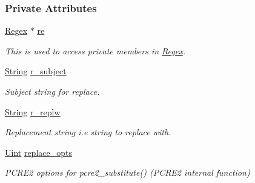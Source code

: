 \subsubsection*{Private Attributes}
\begin{DoxyCompactItemize}
\item 
\hypertarget{classjpcre2_1_1RegexReplace_ab8adfdb3aade18fe6bff03fb3262c396}{}\label{classjpcre2_1_1RegexReplace_ab8adfdb3aade18fe6bff03fb3262c396} 
\hyperlink{classjpcre2_1_1Regex}{Regex} $\ast$ \hyperlink{classjpcre2_1_1RegexReplace_ab8adfdb3aade18fe6bff03fb3262c396}{re}
\begin{DoxyCompactList}\small\item\em This is used to access private members in \hyperlink{classjpcre2_1_1Regex}{Regex}. \end{DoxyCompactList}\item 
\hypertarget{classjpcre2_1_1RegexReplace_a2290e5d9f1c2336abd431fef97e72c93}{}\label{classjpcre2_1_1RegexReplace_a2290e5d9f1c2336abd431fef97e72c93} 
\hyperlink{namespacejpcre2_a91f03070152fb228bc116c5a737f1d16}{String} \hyperlink{classjpcre2_1_1RegexReplace_a2290e5d9f1c2336abd431fef97e72c93}{r\+\_\+subject}
\begin{DoxyCompactList}\small\item\em Subject string for replace. \end{DoxyCompactList}\item 
\hypertarget{classjpcre2_1_1RegexReplace_a73d0da1aac8b83a0a47b24629b5013f4}{}\label{classjpcre2_1_1RegexReplace_a73d0da1aac8b83a0a47b24629b5013f4} 
\hyperlink{namespacejpcre2_a91f03070152fb228bc116c5a737f1d16}{String} \hyperlink{classjpcre2_1_1RegexReplace_a73d0da1aac8b83a0a47b24629b5013f4}{r\+\_\+replw}
\begin{DoxyCompactList}\small\item\em Replacement string i.\+e string to replace with. \end{DoxyCompactList}\item 
\hypertarget{classjpcre2_1_1RegexReplace_afc79699cfcad8b7cbb26864b6b67cdc7}{}\label{classjpcre2_1_1RegexReplace_afc79699cfcad8b7cbb26864b6b67cdc7} 
\hyperlink{namespacejpcre2_a078242d38221a13fb3543b9edd78c099}{Uint} \hyperlink{classjpcre2_1_1RegexReplace_afc79699cfcad8b7cbb26864b6b67cdc7}{replace\+\_\+opts}
\begin{DoxyCompactList}\small\item\em P\+C\+R\+E2 options for pcre2\+\_\+substitute() (P\+C\+R\+E2 internal function) \end{DoxyCompactList}\item 

\end{DoxyCompactItemize}
